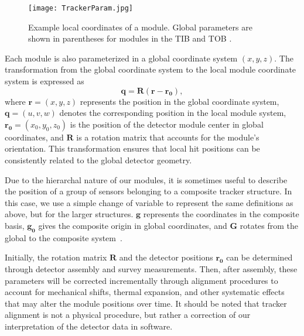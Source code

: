 \begin{figure}[!hbt]
    \begin{center}
        \texttt{[image: TrackerParam.jpg]}
        \caption{Example local coordinates of a module. Global parameters are shown in parentheses for modules in the TIB and TOB \cite{WAdam_2009}.}
        \label{fig:TrackerParam}
    \end{center}
\end{figure}

Each module is also parameterized in a global coordinate system $(x, y, z)$. The transformation from the global coordinate system to the local module coordinate system is expressed as
\begin{equation}
    \mathbf{q} = \mathbf{R} (\mathbf{r} - \mathbf{r_0}),
\end{equation}  
where $\mathbf{r} = (x,y,z)$ represents the position in the global coordinate system, $\mathbf{q} = (u,v,w)$ denotes the corresponding position in the local module system, $\mathbf{r_0} = (x_0,y_0,z_0)$ is the position of the detector module center in global coordinates, and $\mathbf{R}$ is a rotation matrix that accounts for the module's orientation. This transformation ensures that local hit positions can be consistently related to the global detector geometry. 

Due to the hierarchal nature of our modules, it is sometimes useful to describe the position of a group of sensors belonging to a composite tracker structure. In this case, we use a simple change of variable to represent the same definitions as above, but for the larger structures. $\mathbf{g}$ represents the coordinates in the composite basis, $\mathbf{g_0}$ gives the composite origin in global coordinates, and $\mathbf{G}$ rotates from the global to the composite system~\cite{Karimaki:926537}.

Initially, the rotation matrix $\mathbf{R}$ and the detector positions $\mathbf{r_0}$ can be determined through detector assembly and survey measurements. Then, after assembly, these parameters will be corrected incrementally through alignment procedures to account for mechanical shifts, thermal expansion, and other systematic effects that may alter the module positions over time. It should be noted that tracker alignment is not a physical procedure, but rather a correction of our interpretation of the detector data in software. 




